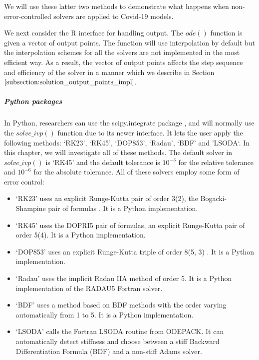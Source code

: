 We will use these latter two methods to demonstrate what happens when non-error-controlled solvers are applied to Covid-19 models.

We next consider the R interface for handling output. The $ode()$ function is given a vector of output points.  The function will use interpolation by default but the interpolation schemes for all the solvers are not implemented in the most efficient way. As a result, the vector of output points affects the step sequence and efficiency of the solver in a manner which we describe in Section $\ref{subsection:solution_output_points_impl}$.

\subparagraph{Python packages}
In Python, researchers can use the scipy.integrate package \cite{2020SciPy-NMeth}, and will normally use the $solve\_ivp()$ function due to its newer interface. It lets the user apply the following methods: `RK23', `RK45', `DOP853', `Radau', `BDF' and 'LSODA`. In this chapter, we will investigate all of these methods. The default solver in $solve\_ivp()$ is `RK45' and the default tolerance is $10^{-3}$ for the relative tolerance and $10^{-6}$ for the absolute tolerance. All of these solvers employ some form of error control:

\begin{itemize}
\item `RK23' uses an explicit Runge-Kutta pair of order 3(2), the Bogacki-Shampine pair of formulas \cite{MR1025845}. It is a Python implementation.

\item `RK45' uses the DOPRI5 pair of formulas, an explicit Runge-Kutta pair of order 5(4). It is a Python implementation.

\item `DOP853' uses an explicit Runge-Kutta triple of order 8(5, 3) \cite{hairerWebsite}. It is a Python implementation.

\item `Radau' uses the implicit Radau IIA method of order 5. It is a Python implementation of the RADAU5 Fortran solver.

\item `BDF' uses a method based on BDF methods with the order varying automatically from 1 to 5. It is a Python implementation.

\item `LSODA' calls the Fortran LSODA routine from ODEPACK. It can automatically detect stiffness and choose between a stiff Backward Differentiation Formula (BDF) and a non-stiff Adams solver.
\end{itemize}

